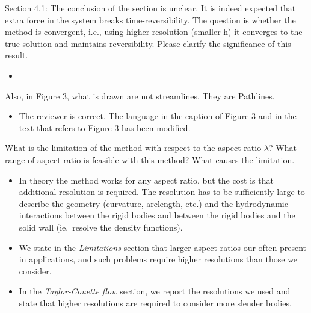 \documentclass[11pt]{article}
\newcommand{\comment}[1]{{\color{blue} #1}}
\begin{document}
\noindent
\comment{Section 4.1: The conclusion of the section is unclear.  It is
  indeed expected that extra force in the system breaks
  time-reversibility.  The question is whether the method is convergent,
  i.e., using higher resolution (smaller h) it converges to the true
  solution and maintains reversibility.  Please clarify the significance
of this result.}
\begin{itemize}
  \item {}
\end{itemize}

\noindent
\comment{Also, in Figure 3, what is drawn are not streamlines.  They are
Pathlines.}
\begin{itemize}
  \item The reviewer is correct.  The language in the caption of Figure
    3 and in the text that refers to Figure 3 has been modified.
\end{itemize}


\noindent
\comment{What is the limitation of the method with respect to the aspect
ratio $\lambda$?  What range of aspect ratio is feasible with this
method?  What causes the limitation.}
\begin{itemize}
  \item In theory the method works for any aspect ratio, but the cost is
    that additional resolution is required.  The resolution has to be
    sufficiently large to describe the geometry (curvature, arclength,
    etc.) and the hydrodynamic interactions between the rigid bodies and
    between the rigid bodies and the solid wall (ie.~resolve the density
    functions).
    
  \item We state in the {\em Limitations} section that larger aspect
    ratios our often present in applications, and such problems require
    higher resolutions than those we consider.

  \item In the {\em Taylor-Couette flow} section, we report the
    resolutions we used and state that higher resolutions are required
    to consider more slender bodies.

\end{itemize}
\end{document}
